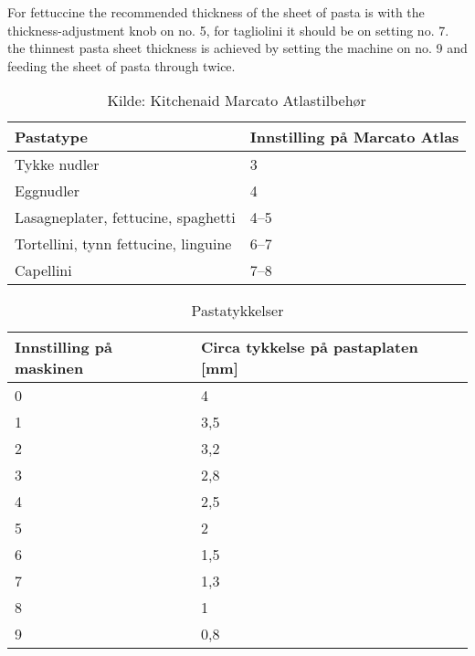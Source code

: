 For fettuccine the recommended thickness of the sheet of pasta is with the  thickness-adjustment knob on no. 5, for tagliolini it should
be on setting no. 7.
the thinnest pasta sheet thickness is achieved by setting the machine
on no. 9 and feeding the sheet of pasta through twice.\\


\begin{table}[]
\centering
\begin{tabular}{ll}
\toprule
Pastatype                            & Innstilling på Marcato Atlas \\ \midrule
Tykke nudler                         & 3                            \\
Eggnudler                            & 4                            \\
Lasagneplater, fettucine, spaghetti  & 4--5                         \\
Tortellini, tynn fettucine, linguine & 6--7                         \\
Capellini                            & 7--8                         \\ \bottomrule
\end{tabular}
\caption{Kilde: Kitchenaid Marcato Atlastilbehør}
\label{pastatyper}
\end{table}


\begin{table}[]
\centering
\begin{tabular}{ll}
\toprule
Innstilling på maskinen & Circa tykkelse på pastaplaten [mm] \\ \midrule
0                       & 4                                              \\
1                       & 3,5                                            \\
2                       & 3,2                                            \\
3                       & 2,8                                            \\
4                       & 2,5                                            \\
5                       & 2                                              \\
6                       & 1,5                                            \\
7                       & 1,3                                            \\
8                       & 1                                              \\
9                       & 0,8                                            \\ \bottomrule
\end{tabular}
\caption{Pastatykkelser}
\label{pastatykkelser}
\end{table}

